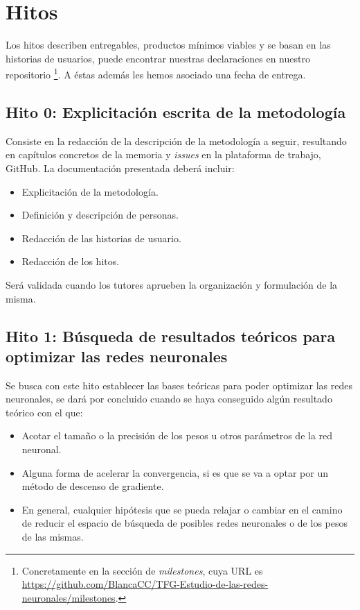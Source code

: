 \section{Hitos} \label{ch00:hitos} 

Los hitos describen entregables, productos mínimos viables y se basan en las historias de usuarios,
puede encontrar nuestras declaraciones en nuestro repositorio \footnote{Concretamente en la sección de \textit{milestones}, cuya URL es \url{https://github.com/BlancaCC/TFG-Estudio-de-las-redes-neuronales/milestones}.}. 
A éstas además les hemos asociado una fecha de entrega. 


\subsection*{Hito 0: Explicitación escrita de la metodología} 
Consiste en la redacción de la descripción de la metodología a seguir, resultando en capítulos concretos de la memoria 
y \textit{issues} en la plataforma de trabajo, GitHub.  
La documentación presentada deberá incluir: 
\begin{itemize}
    \item Explicitación de la metodología. 
    \item Definición y descripción de personas.
    \item Redacción de las historias de usuario.
    \item Redacción de los hitos.
\end{itemize}
Será validada cuando los tutores aprueben la organización y formulación de la misma.


\subsection*{Hito 1: Búsqueda de resultados teóricos para optimizar  las redes neuronales}

Se busca con este hito establecer las bases teóricas para poder optimizar las redes neuronales, se dará por concluido cuando se haya conseguido algún resultado teórico con el que:
\begin{itemize}
    \item Acotar el tamaño o la precisión de los pesos u otros parámetros de la red neuronal.
    \item Alguna forma de acelerar la convergencia, si es que se va a optar por un método de descenso de gradiente.
    \item En general, cualquier hipótesis que se pueda relajar o cambiar en el camino de reducir el espacio de búsqueda de posibles redes neuronales o de los pesos de las mismas.
\end{itemize}

